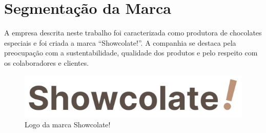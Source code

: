 \documentclass[
	12pt,				%
	openright,			%
	oneside,			%
	a4paper,			%
	english,			%
	french,				%
	spanish,			%
	brazil				%
	]{abntex2}
\begin{document}

\chapter{Segmentação da Marca}

A empresa descrita neste trabalho foi caracterizada como produtora de chocolates especiais e foi criada a marca “Showcolate!”. A companhia se destaca pela preocupação com a sustentabilidade, qualidade dos produtos e pelo respeito com os colaboradores e clientes.

\begin{figure}[H]
\begin{center}
\caption{Logo da marca Showcolate!}
\includegraphics[scale=0.5]{logoShow.jpeg} 
\end{center}
\end{figure}
\end{document}

